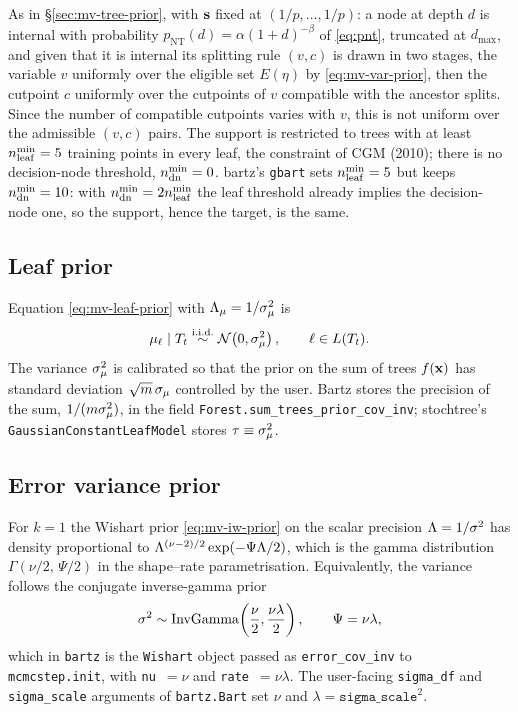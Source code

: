 As in \S\ref{sec:mv-tree-prior}, with $\mathbf{s}$ fixed at $(1/p, \dots, 1/p)$: a
node at depth $d$ is internal with probability
$p_{\mathrm{NT}}(d) = \alpha(1+d)^{-\beta}$ of \eqref{eq:pnt}, truncated at
$d_{\max}$, and given that it is internal its splitting rule $(v, c)$ is
drawn in two stages, the variable $v$ uniformly over the eligible set
$E(\eta)$ by \eqref{eq:mv-var-prior}, then the cutpoint $c$ uniformly over
the cutpoints of $v$ compatible with the ancestor splits. Since the number
of compatible cutpoints varies with $v$, this is not uniform over the
admissible $(v, c)$ pairs. The support is restricted to trees with at least
$n^{\min}_{\mathrm{leaf}} = 5$ training points in every leaf, the constraint of CGM (2010);
there is no decision-node threshold, $n^{\min}_{\mathrm{dn}} = 0$. bartz's \texttt{gbart}
sets $n^{\min}_{\mathrm{leaf}} = 5$ but keeps $n^{\min}_{\mathrm{dn}} = 10$: with
$n^{\min}_{\mathrm{dn}} = 2n^{\min}_{\mathrm{leaf}}$ the leaf threshold already implies the decision-node
one, so the support, hence the target, is the same.

\subsection{Leaf prior}

Equation \eqref{eq:mv-leaf-prior} with $\Lambda_{\mu} = 1/\sigma_\mu^{2}$ is
\begin{equation}
	\label{eq:leaf-prior}
	\mu_\ell \mid T_t \stackrel{\text{i.i.d.}}{\sim}
	\mathcal{N}\!\left(0, \sigma_\mu^{2}\right),
	\qquad \ell \in L(T_t).
\end{equation}
The variance $\sigma_\mu^{2}$ is calibrated so that the prior on the sum of trees
$f(\mathbf{x})$ has standard deviation $\sqrt{m}\,\sigma_\mu$ controlled by the user. Bartz
stores the precision of the sum, $1/(m\sigma_\mu^{2})$, in the field
\texttt{Forest.sum\_trees\_prior\_cov\_inv}; stochtree's
\texttt{GaussianConstantLeafModel} stores $\tau \equiv \sigma_\mu^{2}$.

\subsection{Error variance prior}
\label{sec:sigma-prior}

For $k = 1$ the Wishart prior \eqref{eq:mv-iw-prior} on the scalar
precision $\Lambda = 1/\sigma^{2}$ has density proportional to
$\Lambda^{(\nu - 2)/2}\exp(-\Psi\Lambda/2)$, which is the gamma distribution
$\Gamma(\nu/2,\, \Psi/2)$ in the shape--rate parametrisation. Equivalently,
the variance follows the conjugate inverse-gamma prior
\begin{equation}
	\label{eq:sigma-prior}
	\sigma^{2} \sim \mathrm{InvGamma}\!\left(\frac{\nu}{2}, \frac{\nu\lambda}{2}\right),
	\qquad \Psi = \nu\lambda,
\end{equation}
which in \texttt{bartz} is the \texttt{Wishart} object passed as
\texttt{error\_cov\_inv} to \texttt{mcmcstep.init}, with
\texttt{nu}~$=\nu$ and \texttt{rate}~$=\nu\lambda$. The user-facing
\texttt{sigma\_df} and \texttt{sigma\_scale} arguments of \texttt{bartz.Bart}
set $\nu$ and $\lambda = \texttt{sigma\_scale}^2$.

